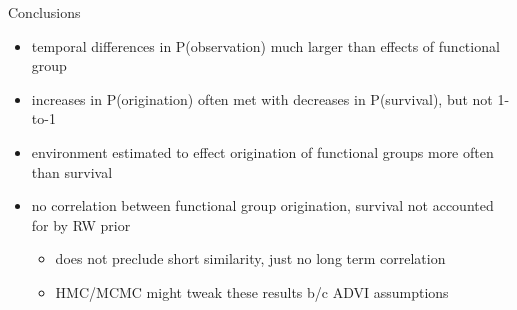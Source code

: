 \documentclass[aspectratio=169]{beamer}
\begin{document}
\begin{frame}
  \begin{alertblock}{Conclusions}
    \begin{itemize}
      \item temporal differences in P(observation) much larger than effects of functional group
      \item increases in P(origination) often met with decreases in P(survival), but not 1-to-1
      \item environment estimated to effect origination of functional groups more often than survival
      \item no correlation between functional group origination, survival not accounted for by RW prior
        \begin{itemize}
          \item does not preclude short similarity, just no long term correlation
          \item HMC/MCMC might tweak these results b/c ADVI assumptions
        \end{itemize}
    \end{itemize}
  \end{alertblock}
\end{frame}
\end{document}

